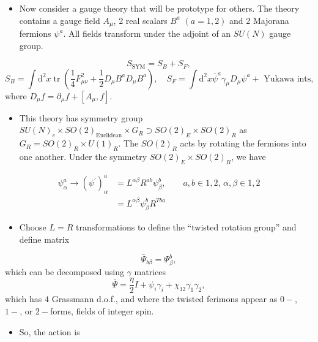 \begin{itemize}
  \item Now consider a gauge theory that will be prototype for others. The theory contains a gauge field $A_\mu$, 2 real scalars $B^a$ $(a=1,2)$ and 2 Majorana fermions $\psi^a$. All fields transform under the adjoint of an $SU(N)$ gauge group.
\end{itemize}
\begin{equation}
    S_{\text{SYM}} = S_B + S_F,
\end{equation}
\begin{equation}
    S_B = \int \text{d}^2 x \operatorname{tr}\left(\frac{1}{4}F_{\mu \nu}^2 + \frac{1}{2}D_\mu B^a D_\mu B^a\right), \quad S_F = \int \text{d}^2x \bar{\psi}^a \gamma_\mu D_\mu \psi^a + \text{ Yukawa ints,}
\end{equation}
where $D_\mu f = \partial_\mu f + [A_\mu,f]$.
\begin{itemize}
    \item This theory has symmetry group $SU(N)_c \times SO(2)_{\text{Euclidean}} \times G_R \supset SO(2)_E \times SO(2)_R$ as $G_R = SO(2)_R \times U(1)_R$. The $SO(2)_R$ acts by rotating the fermions into one another. Under the symmetry $SO(2)_E \times SO(2)_R$, we have
\end{itemize}
\begin{align}
    \psi_\alpha^a \to (\psi^\prime)_\alpha^{a} &= L^{\alpha \beta}R^{ab}\psi_\beta^b, \qquad a,b\in 1,2, \, \alpha,\beta \in 1,2 \nonumber \\
    &= L^{\alpha \beta}\psi_\beta^b R^{T ba}
\end{align}
\begin{itemize}
    \item Choose $L=R$ transformations to define the ``twisted rotation group'' and define matrix
\end{itemize}
\begin{equation}
    \bar{\Psi}_{b \beta} = \Psi^b_\beta,
\end{equation}
which can be decomposed using $\gamma$ matrices
\begin{equation}
    \bar{\Psi} = \frac{\eta}{2}I + \psi_i \gamma_i + \chi_{12}\gamma_1 \gamma_2,
\end{equation}
which has $4$ Grassmann d.o.f., and where the twisted ferimons appear as $0-$, $1-$, or $2-$forms, fields of integer spin.
\begin{itemize}
    \item So, the action is 
\end{itemize}
